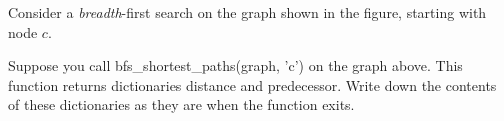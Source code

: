 \begin{prob}

    Consider a \emph{breadth}-first search on the graph shown in the figure, starting with node $c$.

    \begin{center}
    \end{center}
    
     \begin{subprobset}
        \begin{subprob}
            Suppose you call bfs\_shortest\_paths(graph,
            'c') on the graph above. This function returns dictionaries distance and predecessor. Write down the
            contents of these dictionaries as they are when the function exits.
            
            \begin{figure}[h!]
                \inputminted{python}{\thisdir/include/bfs_shortest_path.py}
            \end{figure}
            

\end{subprob}
\end{subprobset}
\end{prob}

